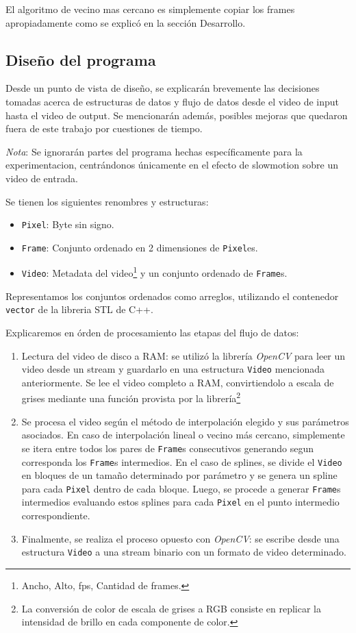 El algoritmo de vecino mas cercano es simplemente copiar los frames apropiadamente como se explicó en la sección Desarrollo.

\subsection{Diseño del programa}
Desde un punto de vista de diseño, se explicarán brevemente las decisiones tomadas acerca de estructuras de datos y flujo de datos desde el video de input hasta el video de output. Se mencionarán además, posibles mejoras que quedaron fuera de este trabajo por cuestiones de tiempo.

\emph{Nota}: Se ignorarán partes del programa hechas específicamente para la experimentacion, centrándonos únicamente en el efecto de slowmotion sobre un video de entrada.

Se tienen los siguientes renombres y estructuras:
\begin{itemize}
	\item \texttt{Pixel}: Byte sin signo.
	\item \texttt{Frame}: Conjunto ordenado en 2 dimensiones de \texttt{Pixel}es.
	\item \texttt{Video}: Metadata del video\footnote{Ancho, Alto, fps, Cantidad de frames.} y un conjunto ordenado de \texttt{Frame}s.
\end{itemize}

Representamos los conjuntos ordenados como arreglos, utilizando el contenedor \texttt{vector} de la libreria STL de C++.

Explicaremos en órden de procesamiento las etapas del flujo de datos:
\begin{enumerate}
    \item Lectura del video de disco a RAM: se utilizó la librería \emph{OpenCV} para leer un video desde un stream y guardarlo en una estructura \texttt{Video} mencionada anteriormente. Se lee el video completo a RAM, convirtiendolo a escala de grises mediante una función provista por la librería\footnote{La conversión de color de escala de grises a RGB consiste en replicar la intensidad de brillo en cada componente de color\cite{grayscale}.}
	\item Se procesa el video según el método de interpolación elegido y sus parámetros asociados. En caso de interpolación lineal o vecino más cercano, simplemente se itera entre todos los pares de \texttt{Frame}s consecutivos generando segun corresponda los \texttt{Frame}s intermedios. En el caso de splines, se divide el \texttt{Video} en bloques de un tamaño determinado por parámetro y se genera un spline para cada \texttt{Pixel} dentro de cada bloque. Luego, se procede a generar \texttt{Frame}s intermedios evaluando estos splines para cada \texttt{Pixel} en el punto intermedio correspondiente.
	\item Finalmente, se realiza el proceso opuesto con \emph{OpenCV}: se escribe desde una estructura \texttt{Video} a una stream binario con un formato de video determinado.
\end{enumerate}

